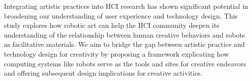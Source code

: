 Integrating artistic practices into HCI research has shown significant potential in broadening our understanding of user experience and technology design. This study explores how robotic art can help the HCI community deepen its understanding of the relationship between human creative behaviors and robots as facilitative materials. We aim to bridge the gap between artistic practice and technology design for creativity by proposing a framework explicating how computing systems like robots serve as the tools and sites for creative endeavors and offering subsequent design implications for creative activities.
